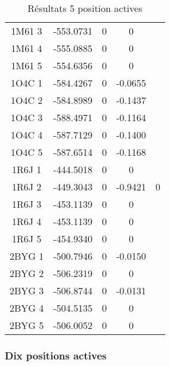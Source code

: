 \begin{table}[h]
\begin{tabular}{ccccc}
        1M61 3 & -553.0731 & 0 & 0 &  \\
        1M61 4 & -555.0885 & 0 & 0 &  \\
        1M61 5 & -554.6356 & 0 & 0 &  \\
        1O4C 1 & -584.4267 & 0 & -0.0655 &  \\
        1O4C 2 & -584.8989 & 0 & -0.1437 &  \\
        1O4C 3 & -588.4971 & 0 & -0.1164 &  \\
        1O4C 4 & -587.7129 & 0 & -0.1400 &  \\
        1O4C 5 & -587.6514 & 0 & -0.1168 &  \\
        1R6J 1 & -444.5018 & 0 & 0 &  \\
        1R6J 2 & -449.3043 & 0 & -0.9421 & 0 \\
        1R6J 3 & -453.1139 & 0 & 0 &  \\
        1R6J 4 & -453.1139 & 0 & 0 &  \\
        1R6J 5 & -454.9340 & 0 & 0 &  \\
        2BYG 1 & -500.7946 & 0 & -0.0150 &  \\
        2BYG 2 & -506.2319 & 0 & 0 &  \\
        2BYG 3 & -506.8744 & 0 & -0.0131 &  \\
        2BYG 4 & -504.5135 & 0 & 0 &  \\
        2BYG 5 & -506.0052 & 0 & 0 &  \\
        \bottomrule
      \end{tabular}      
 \caption{Résultats 5 position actives}
\label{tab:result_5_actives}
\end{table}

   \subsubsection{Dix positions actives}


